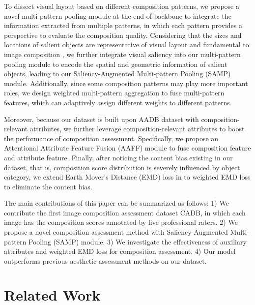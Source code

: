 \documentclass{bmvc2k}
\begin{document}
To dissect visual layout based on different composition patterns, we propose a novel multi-pattern pooling module at the end of backbone to integrate the information extracted from multiple patterns, in which each pattern provides a perspective to evaluate the composition quality. Considering that the sizes and locations of salient objects are representative of visual layout and fundamental to image composition \cite{lok2004evaluation}, we further integrate visual saliency \cite{Hou2007SaliencyDA} into our multi-pattern pooling module to encode the spatial and geometric information of salient objects, leading to our Saliency-Augmented Multi-pattern Pooling (SAMP) module. Additionally, since some composition patterns may play more important roles, we design weighted multi-pattern aggregation to fuse multi-pattern features, which can adaptively assign different weights to different patterns.  

Moreover, because our dataset is built upon AADB dataset \cite{Kong2016PhotoAR} with composition-relevant attributes, we further leverage composition-relevant attributes to boost the performance of composition assessment. Specifically, we propose an Attentional Attribute Feature Fusion (AAFF) module to fuse composition feature and attribute feature. Finally, after noticing the content bias existing in our dataset, that is, composition score distribution is severely influenced by object category, we extend Earth Mover's Distance (EMD) loss in \cite{Hou2016SquaredEM} to weighted EMD loss to eliminate the content bias. 

The main contributions of this paper can be summarized as follows: 1) We contribute the first image composition assessment dataset CADB, in which each image has the composition scores annotated by five professional raters. 2) We propose a novel composition assessment method with Saliency-Augmented Multi-pattern Pooling (SAMP) module. 3) We investigate the effectiveness of auxiliary attributes and weighted EMD loss for composition assessment. 4) Our model outperforms previous aesthetic assessment methods on our dataset. 
\vspace{-3mm}
\section{Related Work}
\end{document}
